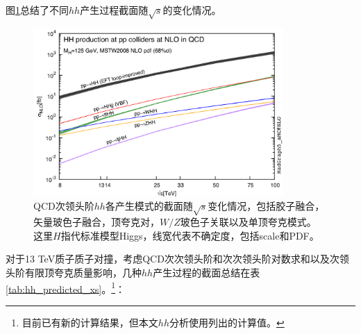 图\ref{fig:diagram_SMhh_VBF}总结了不同$hh$产生过程截面随$\sqrt{s}$的变化情况。
\begin{figure}[h]
\centering
 \includegraphics[width=0.85\textwidth]{fig/HH-xsec.png}
\caption{QCD次领头阶$hh$各产生模式的截面随$\sqrt{s}$变化情况\cite{Frederix:2014hta}，包括胶子融合，矢量玻色子融合，顶夸克对，$W/Z$玻色子关联以及单顶夸克模式。
这里$H$指代标准模型Higgs，线宽代表不确定度，包括scale和PDF。}
\label{fig:diagram_SMhh_VBF}
\end{figure}
对于13 TeV质子质子对撞，考虑QCD次次领头阶和次次领头阶对数求和以及次领头阶有限顶夸克质量影响，几种$hh$产生过程的截面\cite{deFlorian:2016spz}总结在表\ref{tab:hh_predicted_xs}。\footnote{目前已有新的计算结果\cite{Grazzini:2018bsd,deFlorian:2013jea}，但本文$hh$分析使用列出的计算值。}：
\begin{table}[h]
\centering
{}
\caption{13 TeV质心系能量下标准模型$hh$（假设$m_h$= 125.09 GeV, 但对于$gg\rightarrow hhh$,
$m_h$=125 GeV）产生截面理论预测值(fb)。}
\label{tab:hh_predicted_xs}
\end{table}

